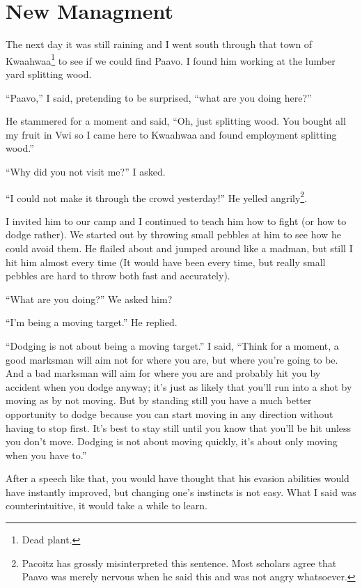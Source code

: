 \chapter{New Managment}

The next day it was still raining and I went south through that town of Kwaa\-hwaa\footnote{Dead plant.} to see if we could find Paavo. I found him working at the lumber yard splitting wood.

``Paavo,'' I said, pretending to be surprised, ``what are you doing here?''

He stammered for a moment and said, ``Oh, just splitting wood. You bought all my fruit in Vwi so I came here to Kwaa\-hwaa and found employment splitting wood.''

``Why did you not visit me?'' I asked.

``I could not make it through the crowd yesterday!'' He yelled angrily\footnote{Pacoitz has grossly misinterpreted this sentence. Most scholars agree that Paavo was merely nervous when he said this and was not angry whatsoever.}.

I invited him to our camp and I continued to teach him how to fight (or how to dodge rather).
We started out by throwing small pebbles at him to see how he could avoid them. He flailed about and jumped around like a madman, but still I hit him almost every time (It would have been every time, but really small pebbles are hard to throw both fast and accurately).

``What are you doing?'' We asked him?

``I'm being a moving target.'' He replied.

``Dodging is not about being a moving target.'' I said, ``Think for a moment, a good marksman will aim not for where you are, but where you're going to be. And a bad marksman will aim for where you are and probably hit you by accident when you dodge anyway; it's just as likely that you'll run into a shot by moving as by not moving. But by standing still you have a much better opportunity to dodge because you can start moving in any direction without having to stop first. It's best to stay still until you know that you'll be hit unless you don't move.
Dodging is not about moving quickly, it's about only moving when you have to.''

After a speech like that, you would have thought that his evasion abilities would have instantly improved, but changing one's instincts is not easy. What I said was counterintuitive, it would take a while to learn.

